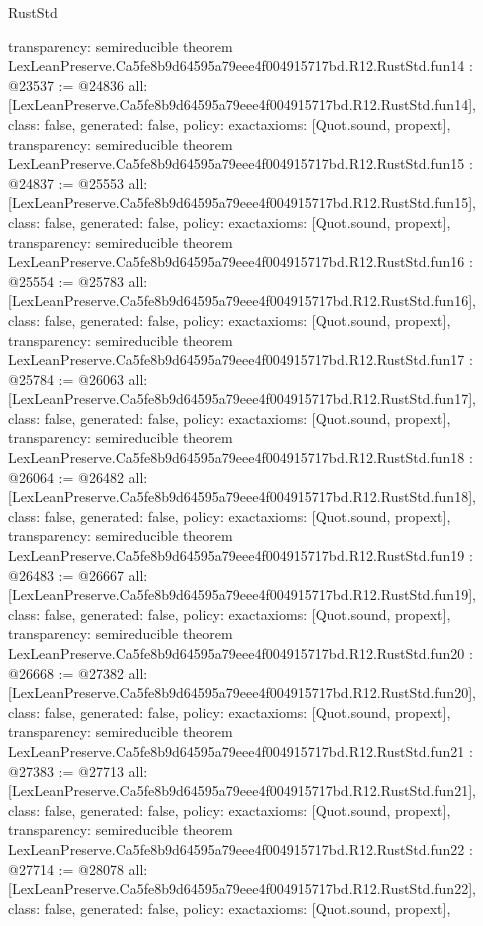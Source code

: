 \begin{lexlean}{RustStd}
\begin{coremodule}
{  transparency: semireducible
}
theorem LexLeanPreserve.Ca5fe8b9d64595a79eee4f004915717bd.R12.RustStd.fun14 : @23537 := @24836 {
  all: [LexLeanPreserve.Ca5fe8b9d64595a79eee4f004915717bd.R12.RustStd.fun14],
  class: false,
  generated: false,
  policy: exact{axioms: [Quot.sound, propext]},
  transparency: semireducible
}
theorem LexLeanPreserve.Ca5fe8b9d64595a79eee4f004915717bd.R12.RustStd.fun15 : @24837 := @25553 {
  all: [LexLeanPreserve.Ca5fe8b9d64595a79eee4f004915717bd.R12.RustStd.fun15],
  class: false,
  generated: false,
  policy: exact{axioms: [Quot.sound, propext]},
  transparency: semireducible
}
theorem LexLeanPreserve.Ca5fe8b9d64595a79eee4f004915717bd.R12.RustStd.fun16 : @25554 := @25783 {
  all: [LexLeanPreserve.Ca5fe8b9d64595a79eee4f004915717bd.R12.RustStd.fun16],
  class: false,
  generated: false,
  policy: exact{axioms: [Quot.sound, propext]},
  transparency: semireducible
}
theorem LexLeanPreserve.Ca5fe8b9d64595a79eee4f004915717bd.R12.RustStd.fun17 : @25784 := @26063 {
  all: [LexLeanPreserve.Ca5fe8b9d64595a79eee4f004915717bd.R12.RustStd.fun17],
  class: false,
  generated: false,
  policy: exact{axioms: [Quot.sound, propext]},
  transparency: semireducible
}
theorem LexLeanPreserve.Ca5fe8b9d64595a79eee4f004915717bd.R12.RustStd.fun18 : @26064 := @26482 {
  all: [LexLeanPreserve.Ca5fe8b9d64595a79eee4f004915717bd.R12.RustStd.fun18],
  class: false,
  generated: false,
  policy: exact{axioms: [Quot.sound, propext]},
  transparency: semireducible
}
theorem LexLeanPreserve.Ca5fe8b9d64595a79eee4f004915717bd.R12.RustStd.fun19 : @26483 := @26667 {
  all: [LexLeanPreserve.Ca5fe8b9d64595a79eee4f004915717bd.R12.RustStd.fun19],
  class: false,
  generated: false,
  policy: exact{axioms: [Quot.sound, propext]},
  transparency: semireducible
}
theorem LexLeanPreserve.Ca5fe8b9d64595a79eee4f004915717bd.R12.RustStd.fun20 : @26668 := @27382 {
  all: [LexLeanPreserve.Ca5fe8b9d64595a79eee4f004915717bd.R12.RustStd.fun20],
  class: false,
  generated: false,
  policy: exact{axioms: [Quot.sound, propext]},
  transparency: semireducible
}
theorem LexLeanPreserve.Ca5fe8b9d64595a79eee4f004915717bd.R12.RustStd.fun21 : @27383 := @27713 {
  all: [LexLeanPreserve.Ca5fe8b9d64595a79eee4f004915717bd.R12.RustStd.fun21],
  class: false,
  generated: false,
  policy: exact{axioms: [Quot.sound, propext]},
  transparency: semireducible
}
theorem LexLeanPreserve.Ca5fe8b9d64595a79eee4f004915717bd.R12.RustStd.fun22 : @27714 := @28078 {
  all: [LexLeanPreserve.Ca5fe8b9d64595a79eee4f004915717bd.R12.RustStd.fun22],
  class: false,
  generated: false,
  policy: exact{axioms: [Quot.sound, propext]},
}
\end{coremodule}
\end{lexlean}

